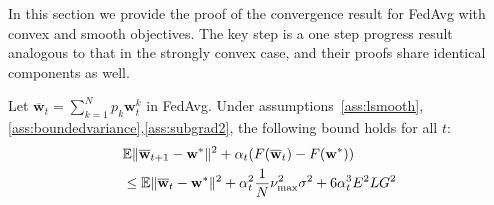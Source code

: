 In this section we provide the proof of the convergence result for FedAvg with convex and smooth objectives. The key step is a one step progress result analogous to that in the strongly convex case, and their proofs share identical components as well. 
\begin{lemma} 
Let $\overline{\mathbf{w}}_{t}=\sum_{k=1}^{N}p_{k}\mathbf{w}_{t}^{k}$ in FedAvg. Under assumptions~\ref{ass:lsmooth},\ref{ass:boundedvariance},\ref{ass:subgrad2}, the following bound holds for all $t$:
\begin{align*}
	&\mathbb{E}\|{\overline{\mathbf{w}}}_{t+1}-{\mathbf{w}}^{\ast}\|^{2}+\alpha_{t}(F({\overline{\mathbf{w}}}_{t})-F({\mathbf{w}}^{\ast}))\\
	& \leq \mathbb{E}\|{\overline{\mathbf{w}}}_{t}-{\mathbf{w}}^{\ast}\|^{2}+\alpha_{t}^{2}\frac{1}{N}\nu_{\max}^{2}\sigma^{2}+6\alpha_{t}^{3}E^{2}LG^{2}
	\end{align*}
	\label{lem:cvxoner}
\end{lemma}

